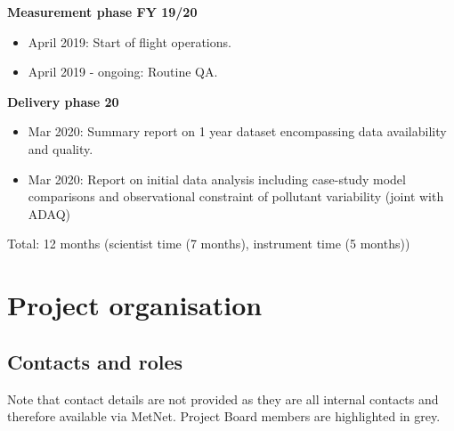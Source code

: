 \documentclass[11pt]{article} %
\begin{document}
\textbf{Measurement phase FY 19/20}
\begin{itemize}
\item	April 2019: Start of flight operations.
\item 	April 2019 - ongoing: Routine QA.
\end{itemize}

\textbf{Delivery phase 20} 
\begin{itemize}
\item  Mar 2020: Summary report on 1 year dataset encompassing data availability and quality. 
\item  Mar 2020: Report on initial data analysis including case-study model comparisons and observational constraint of pollutant variability (joint with ADAQ) 
\end{itemize}
Total: 12 months (scientist time (7 months), instrument time (5 months)) 

\section{Project organisation}

\subsection{Contacts and roles}

Note that contact details are not provided as they are all internal contacts and therefore available via MetNet. Project Board members are highlighted in grey. \\
\end{document}
